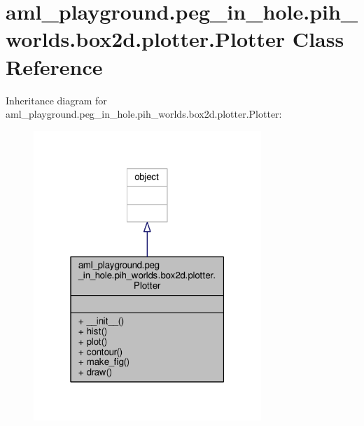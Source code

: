 \hypertarget{classaml__playground_1_1peg__in__hole_1_1pih__worlds_1_1box2d_1_1plotter_1_1_plotter}{\section{aml\-\_\-playground.\-peg\-\_\-in\-\_\-hole.\-pih\-\_\-worlds.\-box2d.\-plotter.\-Plotter Class Reference}
\label{classaml__playground_1_1peg__in__hole_1_1pih__worlds_1_1box2d_1_1plotter_1_1_plotter}
}


Inheritance diagram for aml\-\_\-playground.\-peg\-\_\-in\-\_\-hole.\-pih\-\_\-worlds.\-box2d.\-plotter.\-Plotter\-:\nopagebreak
\begin{figure}[H]
\begin{center}
\leavevmode
\includegraphics[width=244pt]{classaml__playground_1_1peg__in__hole_1_1pih__worlds_1_1box2d_1_1plotter_1_1_plotter__inherit__graph}
\end{center}
\end{figure}


